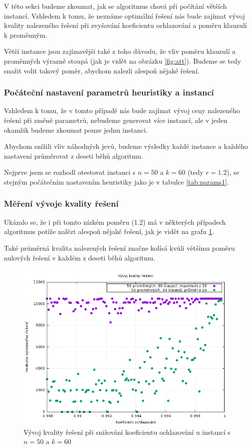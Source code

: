 \documentclass[11pt]{article}
\begin{document}
V této sekci budeme zkoumat, jak se algoritmus chová při počítání větších instancí. Vzhledem k tomu, že neznáme optimální řešení nás bude zajímat vývoj kvality nalezeného řešení při zvyšování koeficientu ochlazování a poměru klauzulí k proměnným.

Větší instance jsou zajímavější také z toho důvodu, že vliv poměru klauzulí a proměnných výrazně stoupá (jak je vidět na obrázku \ref{fig:att}). Budeme se tedy snažit volit takový poměr, abychom nalezli alespoň nějaké řešení.

\subsubsection{Počáteční nastavení parametrů heuristiky a instancí}

Vzhledem k tomu, že v tomto případě nás bude zajímat vývoj ceny nalezeného řešení při změně parametrů, nebudeme generovat více instancí, ale v jeden okamžik budeme zkoumat pouze jednu instanci.

Abychom snížili vliv náhodných jevů, budeme výsledky každé instance a každého nastavení průměrovat z deseti běhů algoritmu.

Nejprve jsem se rozhodl otestovat instanci s $n = 50$ a $k = 60$ (tedy $r= 1.2$), se stejným počátečním nastavením heuristiky jako je v tabulce \ref{tab:params1}. 

\subsubsection{Měření vývoje kvality řešení}
\label{sec:measure_q}

Ukázalo se, že i při tomto nízkém poměru (1.2) má v některých případech algoritmus potíže nalézt alespoň nějaké řešení, jak je vidět na grafu \ref{fig:50_60_cooling_v}.

Také průměrná kvalita nalezených řešení značne kolísá kvůli většímu poměru nulových řešení v každém z deseti běhů algoritmu.

\begin{figure}[h!]
	\centering
	\includegraphics[width=\textwidth]{../grafy/50_60_cooling_v.png}
	\caption{Vývoj kvality řešení při snižování koeficientu ochlazování u instancí s $n=50$ a $k=60$}
	\label{fig:50_60_cooling_v}
\end{figure}
\end{document}
